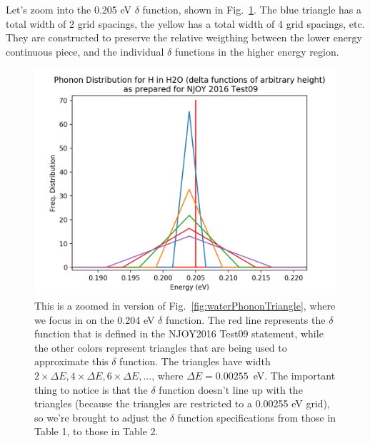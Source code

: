 \documentclass[10pt]{article}
\begin{document}
  Let's zoom into the 0.205 eV $\delta$ function, shown in Fig.~\ref{fig:waterPhononTriangleZoomed}. The blue triangle has a total width of 2 grid spacings, the yellow has a total width of 4 grid spacings, etc. They are constructed to preserve the relative weigthing between the lower energy continuous piece, and the individual $\delta$ functions in the higher energy region.\par
            \begin{figure}[H]
              \begin{center}
              \includegraphics[scale=0.5]{waterPhononDistTrianglesZoomed}
                \caption{This is a zoomed in version of Fig.~\ref{fig:waterPhononTriangle}, where we focus in on the 0.204 eV $\delta$ function. The red line represents the $\delta$ function that is defined in the NJOY2016 Test09 statement, while the other colors represent triangles that are being used to approximate this $\delta$ function. The triangles have width $2\times\Delta E,4\times\Delta E,6\times\Delta E,...$, where $\Delta E=0.00255$~eV. The important thing to notice is that the $\delta$ function doesn't line up with the triangles (because the triangles are restricted to a 0.00255 eV grid), so we're brought to adjust the $\delta$ function specifications from those in Table 1, to those in Table 2.}
              
              \label{fig:waterPhononTriangleZoomed}
              \end{center}
            \end{figure}
\end{document}
